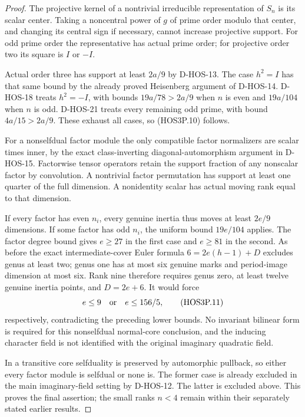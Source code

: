 \begin{proof}
The projective kernel of a nontrivial irreducible representation
of $S_n$ is its scalar center. Taking a noncentral power of $g$
of prime order modulo that center, and changing its central
sign if necessary, cannot increase projective support. For odd
prime order the representative has actual prime order; for
projective order two its square is $I$ or $-I$.

Actual order three has support at least $2a/9$ by D-HOS-13.
The case $h^2=I$ has that same bound by the already proved
Heisenberg argument of D-HOS-14. D-HOS-18 treats $h^2=-I$,
with bounds $19a/78>2a/9$ when $n$ is even and
$19a/104$ when $n$ is odd. D-HOS-21 treats every remaining
odd prime, with bound $4a/15>2a/9$. These exhaust all cases,
so (HOS3P.10) follows.

For a nonselfdual factor module the only compatible factor
normalizers are scalar times inner, by the exact class-inverting
diagonal-automorphism argument in D-HOS-15. Factorwise tensor
operators retain the support fraction of any nonscalar factor
by convolution. A nontrivial factor permutation has support at
least one quarter of the full dimension. A nonidentity scalar
has actual moving rank equal to that dimension.

If every factor has even $n_i$, every genuine inertia thus moves
at least $2e/9$ dimensions. If some factor has odd $n_i$, the
uniform bound $19e/104$ applies. The factor degree bound gives
$e\ge27$ in the first case and $e\ge81$ in the second.
As before the exact intermediate-cover Euler formula
$6=2e(h-1)+D$ excludes genus at least two; genus one has at most
six genuine marks and period-image dimension at most six.
Rank nine therefore requires genus zero, at least twelve
genuine inertia points, and $D=2e+6$. It would force
\[
                 e\le9\quad\hbox{or}\quad e\le156/5,
                                                               \tag{HOS3P.11}
\]
respectively, contradicting the preceding lower bounds.
No invariant bilinear form is required for this nonselfdual
normal-core conclusion, and the inducing character field is
not identified with the original imaginary quadratic field.

In a transitive core selfduality is preserved by automorphic
pullback, so either every factor module is selfdual or none is.
The former case is already excluded in the main imaginary-field
setting by D-HOS-12. The latter is excluded above. This proves
the final assertion; the small ranks $n<4$ remain within their
separately stated earlier results.
\end{proof}

